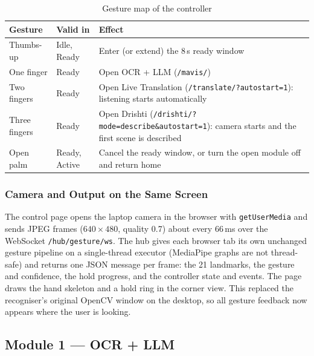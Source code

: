 \documentclass[12pt,singleside,a4paper]{article}
\begin{document}
\begin{table}[H]
\centering
\caption{Gesture map of the controller}
\label{tab:gmap}
\small
\begin{tabularx}{\textwidth}{@{}p{3.2cm}p{2.4cm}X@{}}
\toprule
\textbf{Gesture} & \textbf{Valid in} & \textbf{Effect} \\
\midrule
Thumbs-up & Idle, Ready & Enter (or extend) the 8\,s ready window \\
One finger & Ready & Open OCR + LLM (\texttt{/mavis/}) \\
Two fingers & Ready & Open Live Translation (\texttt{/translate/?autostart=1}): listening starts automatically \\
Three fingers & Ready & Open Drishti (\texttt{/drishti/?mode=describe\&autostart=1}): camera starts and the first scene is described \\
Open palm & Ready, Active & Cancel the ready window, or turn the open module off and return home \\
\bottomrule
\end{tabularx}
\end{table}

\subsubsection{Camera and Output on the Same Screen}
The control page opens the laptop camera in the browser with \texttt{getUserMedia} \cite{w3cmediacapture} and sends JPEG frames ($640\times480$, quality 0.7) about every 66\,ms over the WebSocket \cite{rfc6455} \texttt{/hub/gesture/ws}. The hub gives each browser tab its own unchanged gesture pipeline on a single-thread executor (MediaPipe graphs are not thread-safe) and returns one JSON message per frame: the 21 landmarks, the gesture and confidence, the hold progress, and the controller state and events. The page draws the hand skeleton and a hold ring in the corner view. This replaced the recogniser's original OpenCV window on the desktop, so all gesture feedback now appears where the user is looking.

\subsection{Module 1 --- OCR + LLM}
\end{document}

